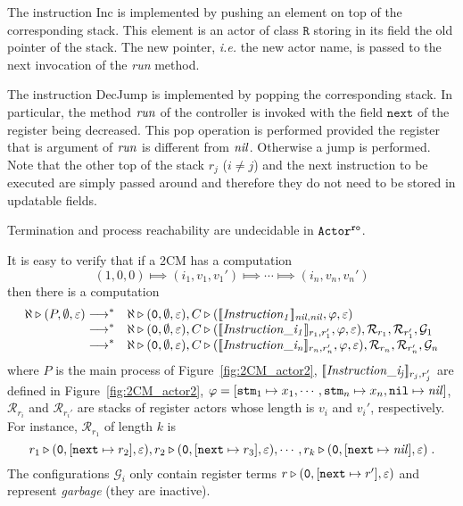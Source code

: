 \documentclass{LMCS}
\newcommand{\cal}{\mathcal}
\theoremstyle{plain}\newtheorem{proposition}[thm]{Proposition}
\theoremstyle{plain}\newtheorem{lemma}[thm]{Lemma}
\theoremstyle{plain}\newtheorem{theorem}[thm]{Theorem}
\theoremstyle{plain}\newtheorem{corollary}[thm]{Corollary}
\newif\ifconf \conffalse
\newcommand{\pinull}{{\tt 0}}
\newcommand{\lred}[1]{\stackrel{#1}{\longrightarrow}}
\newcommand{\semantics}[1]{[\![ #1 ]\!]}
\newcommand{\actro}{${\tt Actor^{\tt ro}}$}
\begin{document}
The instruction {\sf Inc} is implemented by pushing an element on top of the
corresponding stack. This element is an actor of class $\mathtt{R}$ 
storing in its field 
the old pointer of the stack. The new pointer, \emph{i.e.} the new actor name,
is
passed to the next invocation of the {\it run} method.


The instruction {\sf DecJump} is implemented by popping the corresponding
stack. In particular, the method ${\it run}$ of the controller is invoked with the
field $\mathtt{next}$ of the register being decreased. This pop operation is
performed provided the register that is argument of ${\it run}$ is different
from ${\it nil}$. Otherwise a jump is performed.
Note that the other top of the stack $r_j$ ($i\not=j$) and the next instruction
to be executed are simply passed around and therefore they do not need
to be stored in updatable fields.

\begin{thm}
\label{thm.undecidablestateless}
Termination and process reachability 
are undecidable in {\actro}.
\end{thm}

\ifconf
\else

\proof
It is easy to verify that if a 2CM has a computation
\[
(1,0,0) \Longmapsto (i_1,v_1,v_1') \Longmapsto \cdots \Longmapsto (i_n,v_n,v_n')
\]
then there is a computation
\[
\begin{array}{rl}
\aleph \triangleright (P, \emptyset, \varepsilon) \lred{}^* &
\aleph \triangleright (\pinull, \emptyset, \varepsilon), 
C \triangleright (\semantics{{\it Instruction_1}}_{{\it nil},{\it nil}}, \varphi, \varepsilon)
\\
\lred{}^* & 
\aleph \triangleright (\pinull, \emptyset, \varepsilon), 
C \triangleright (\semantics{{\it Instruction\_{i_1}}}_{r_1,r_1'}, \varphi, \varepsilon),
{\cal R}_{r_1}, {\cal R}_{r_1'}, {\cal G}_1
\\
\lred{}^* & 
\aleph \triangleright (\pinull, \emptyset, \varepsilon), 
C \triangleright (\semantics{{\it Instruction\_{i_n}}}_{r_n,r_n'}, \varphi, \varepsilon),
{\cal R}_{r_n}, {\cal R}_{r_n'}, {\cal G}_n
\end{array}
\]
where $P$ is the main process of Figure~\ref{fig:2CM_actor2},
$\semantics{{\it Instruction\_{i_j}}}_{r_j,r_j'}$ are defined in 
Figure~\ref{fig:2CM_actor2},
$\varphi = [ \mathtt{stm}_1 \mapsto x_1, \cdots, \mathtt{stm}_n \mapsto x_n,
\mathtt{nil} \mapsto {\it nil}]$, ${\cal R}_{r_i}$ and ${\cal R}_{r_i'}$ are
stacks of register actors whose length is $v_i$ and $v_i'$, respectively. For
instance, ${\cal R}_{r_1}$ of length $k$ is
\[
r_1 \triangleright (\pinull, [\mathtt{next} \mapsto r_2], \varepsilon),
r_2 \triangleright (\pinull, [\mathtt{next} \mapsto r_3], \varepsilon),
\cdots ,
r_k \triangleright (\pinull, [\mathtt{next} \mapsto {\it nil}], \varepsilon) \; .
\]
The configurations ${\cal G}_i$ only contain register  terms $r \triangleright (\pinull,
[\mathtt{next} \mapsto r'], \varepsilon)$ and represent \emph{garbage} (they are
inactive).
\end{document}
